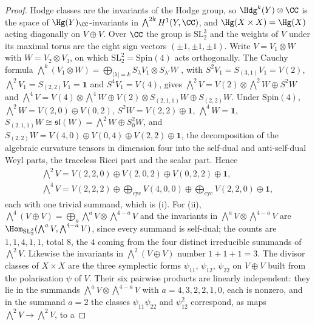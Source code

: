 \begin{proof}
Hodge classes are the invariants of the Hodge group, so
$\Hdg^{k}(Y)\otimes\CC$ is the space of $\Hg(Y)_{\CC}$-invariants in
$\bigwedge^{2k}H^{1}(Y,\CC)$, and $\Hg(X\times X)=\Hg(X)$ acting
diagonally on $V\oplus V$. Over $\CC$ the group is
$\mathrm{SL}_{2}^{3}$ and the weights of $V$ under its maximal torus are the
eight sign vectors $(\pm1,\pm1,\pm1)$. Write $V=V_{1}\otimes W$ with
$W=V_{2}\otimes V_{3}$, on which $\mathrm{SL}_{2}^{2}=\mathrm{Spin}(4)$ acts
orthogonally. The Cauchy formula
$\bigwedge^{k}(V_{1}\otimes W)=\bigoplus_{|\lambda|=k}S_{\lambda}V_{1}\otimes
S_{\lambda'}W$ \cite[\S6.1]{FH91}, with $S^{2}V_{1}=S_{(3,1)}V_{1}=V(2)$,
$\bigwedge^{2}V_{1}=S_{(2,2)}V_{1}=\mathbf{1}$ and $S^{4}V_{1}=V(4)$, gives
$\bigwedge^{2}V=V(2)\otimes\bigwedge^{2}W\oplus S^{2}W$ and
$\bigwedge^{4}V=V(4)\otimes\bigwedge^{4}W\oplus V(2)\otimes S_{(2,1,1)}W
\oplus S_{(2,2)}W$. Under $\mathrm{Spin}(4)$, $\bigwedge^{2}W=V(2,0)\oplus
V(0,2)$, $S^{2}W=V(2,2)\oplus\mathbf{1}$, $\bigwedge^{4}W=\mathbf{1}$,
$S_{(2,1,1)}W\cong\mathfrak{sl}(W)=\bigwedge^{2}W\oplus S^{2}_{0}W$, and
$S_{(2,2)}W=V(4,0)\oplus V(0,4)\oplus V(2,2)\oplus\mathbf{1}$, the
decomposition of the algebraic curvature tensors in dimension four into the
self-dual and anti-self-dual Weyl parts, the traceless Ricci part and the
scalar part. Hence
\begin{gather*}
  \textstyle\bigwedge^{2}V=V(2,2,0)\oplus V(2,0,2)\oplus V(0,2,2)\oplus\mathbf{1},\\
  \textstyle\bigwedge^{4}V=V(2,2,2)\oplus\bigoplus_{\text{cyc}}V(4,0,0)
  \oplus\bigoplus_{\text{cyc}}V(2,2,0)\oplus\mathbf{1},
\end{gather*}
each with one trivial summand, which is (i). For (ii),
$\bigwedge^{4}(V\oplus V)=\bigoplus_{a}\bigwedge^{a}V\otimes\bigwedge^{4-a}V$
and the invariants in $\bigwedge^{a}V\otimes\bigwedge^{4-a}V$ are
$\Hom_{\mathrm{SL}_{2}^{3}}(\bigwedge^{a}V,\bigwedge^{4-a}V)$, since every
summand is self-dual; the counts are $1,1,4,1,1$, total $8$, the $4$ coming
from the four distinct irreducible summands of $\bigwedge^{2}V$. Likewise the
invariants in $\bigwedge^{2}(V\oplus V)$ number $1+1+1=3$. The divisor
classes of $X\times X$ are the three symplectic forms $\psi_{11}$, $\psi_{12}$,
$\psi_{22}$ on $V\oplus V$ built from the polarisation $\psi$ of $V$. Their
six pairwise products are linearly independent: they lie in the summands
$\bigwedge^{a}V\otimes\bigwedge^{4-a}V$ with $a=4,3,2,2,1,0$, each is
nonzero, and in the summand $a=2$ the classes $\psi_{11}\psi_{22}$ and
$\psi_{12}^{2}$ correspond, as maps $\bigwedge^{2}V\to\bigwedge^{2}V$, to a

\end{proof}

